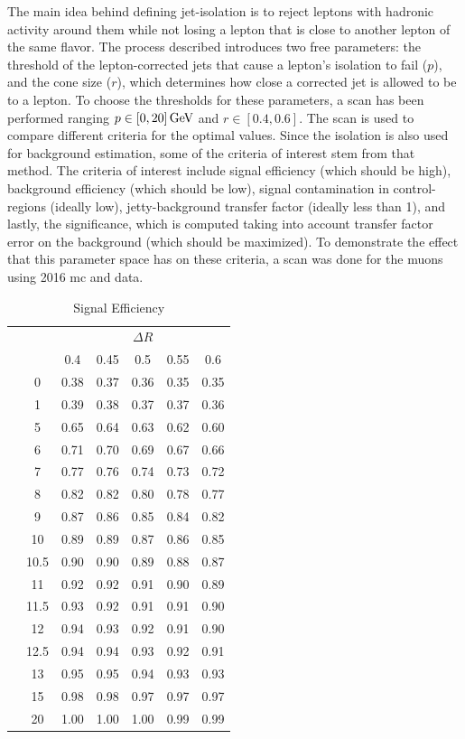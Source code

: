 The main idea behind defining jet-isolation is to reject leptons with hadronic activity around them while not losing a lepton that is close to another lepton of the same flavor. The process described introduces two free parameters: the \pt threshold of the lepton-corrected jets that cause a lepton's isolation to fail ($p$), and the cone size ($r$), which determines how close a corrected jet is allowed to be to a lepton. To choose the thresholds for these parameters, a scan has been performed ranging $p\in [0,20]\,\text{Ge\hspace{-.08em}V}$ and $r\in[0.4,0.6]$. The scan is used to compare different criteria for the optimal values. Since the isolation is also used for background estimation, some of the criteria of interest stem from that method. The criteria of interest include signal efficiency (which should be high), background efficiency (which should be low), signal contamination in control-regions (ideally low), jetty-background transfer factor (ideally less than 1), and lastly, the significance, which is computed taking into account transfer factor error on the background (which should be maximized). To demonstrate the effect that this parameter space has on these criteria, a scan was done for the muons using 2016 \gls{mc} and data.

\begin{table}[!htb]
	\centering
	\label{tab:iso-scan-signal-efficiency}
		\caption{Signal Efficiency}
			\begin{tabular}{cc|ccccc}
    			&\multicolumn{1}{c}{} & \multicolumn{5}{c}{$\Delta R$} \\
    && 0.4 & 0.45 & 0.5 & 0.55 & 0.6 \\
    \cline{2-7}
    & 0 & 0.38 & 0.37 & 0.36 & 0.35 & 0.35 \\
& 1 & 0.39 & 0.38 & 0.37 & 0.37 & 0.36 \\
& 5 & 0.65 & 0.64 & 0.63 & 0.62 & 0.60 \\
& 6 & 0.71 & 0.70 & 0.69 & 0.67 & 0.66 \\
& 7 & 0.77 & 0.76 & 0.74 & 0.73 & 0.72 \\
& 8 & 0.82 & 0.82 & 0.80 & 0.78 & 0.77 \\
\smash{\rotatebox[origin=c]{90}{\pt}} & 9 & 0.87 & 0.86 & 0.85 & 0.84 & 0.82 \\
& 10 & 0.89 & 0.89 & 0.87 & 0.86 & 0.85 \\
& 10.5 & 0.90 & 0.90 & 0.89 & 0.88 & 0.87 \\
& 11 & 0.92 & 0.92 & 0.91 & 0.90 & 0.89 \\
& 11.5 & 0.93 & 0.92 & 0.91 & 0.91 & 0.90 \\
& 12 & 0.94 & 0.93 & 0.92 & 0.91 & 0.90 \\
& 12.5 & 0.94 & 0.94 & 0.93 & 0.92 & 0.91 \\
& 13 & 0.95 & 0.95 & 0.94 & 0.93 & 0.93 \\
& 15 & 0.98 & 0.98 & 0.97 & 0.97 & 0.97 \\
& 20 & 1.00 & 1.00 & 1.00 & 0.99 & 0.99
  \end{tabular}
\end{table}

